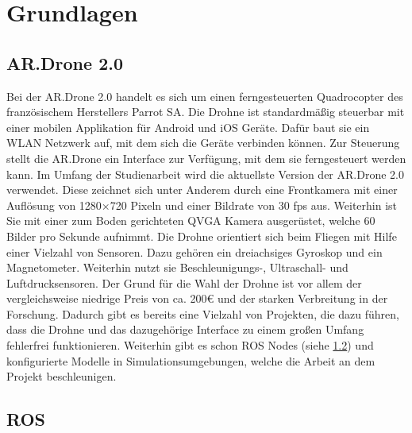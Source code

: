 \chapter{Grundlagen}
\label{cha:Fundamentals}

\section{AR.Drone 2.0}
Bei der AR.Drone 2.0 handelt es sich um einen ferngesteuerten Quadrocopter des französischem Herstellers Parrot SA. \cite{drone} Die Drohne ist standardmäßig steuerbar mit einer mobilen Applikation für Android und iOS Geräte. Dafür baut sie ein WLAN Netzwerk auf, mit dem sich die Geräte verbinden können. Zur Steuerung stellt die AR.Drone ein Interface zur Verfügung, mit dem sie ferngesteuert werden kann. \newline
Im Umfang der Studienarbeit wird die aktuellste Version der AR.Drone 2.0 verwendet. Diese zeichnet sich unter Anderem durch eine Frontkamera mit einer Auflösung von 1280×720 Pixeln und einer Bildrate von 30 fps aus. Weiterhin ist Sie mit einer zum Boden gerichteten QVGA Kamera ausgerüstet, welche 60 Bilder pro Sekunde aufnimmt. \newline
Die Drohne orientiert sich beim Fliegen mit Hilfe einer Vielzahl von Sensoren. Dazu gehören ein dreiachsiges Gyroskop und ein Magnetometer. Weiterhin nutzt sie Beschleunigungs-, Ultraschall- und Luftdrucksensoren. \newline
Der Grund für die Wahl der Drohne ist vor allem der vergleichsweise niedrige Preis von ca. 200€ und der starken Verbreitung in der Forschung. Dadurch gibt es bereits eine Vielzahl von Projekten, die dazu führen, dass die Drohne und das dazugehörige Interface zu einem großen Umfang fehlerfrei funktionieren. \newline
Weiterhin gibt es schon ROS Nodes (siehe \ref{ROS}) und konfigurierte Modelle in Simulationsumgebungen, welche die Arbeit an dem Projekt beschleunigen.


\section{ROS}
\label{ROS}
